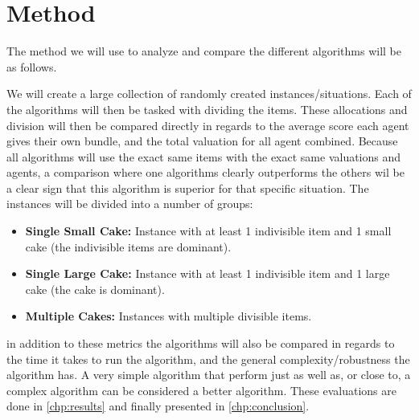 \chapter{Method}\label{chp:method}

The method we will use to analyze and compare the different algorithms will be as follows.

We will create a large collection of randomly created instances/situations. Each of the algorithms will then be tasked with dividing the items. These allocations and division will then be compared directly in regards to the average score each agent gives their own bundle, and the total valuation for all agent combined. Because all algorithms will use the exact same items with the exact same valuations and agents, a comparison where one algorithms clearly outperforms the others wil be a clear sign that this algorithm is superior for that specific situation. The instances will be divided into a number of groups:

\begin{itemize}
    \item \textbf{Single Small Cake:} Instance with at least 1 indivisible item and 1 small cake (the indivisible items are dominant).
    \item \textbf{Single Large Cake:} Instance with at least 1 indivisible item and 1 large cake (the cake is dominant).
    \item \textbf{Multiple Cakes:} Instances with multiple divisible items. 
\end{itemize}

in addition to these metrics the algorithms will also be compared in regards to the time it takes to run the algorithm, and the general complexity/robustness the algorithm has. A very simple algorithm that perform just as well as, or close to, a complex algorithm can be considered a better algorithm. These evaluations are done in \autoref{chp:results} and finally presented in \autoref{chp:conclusion}. 


\clearpage

\clearpage


